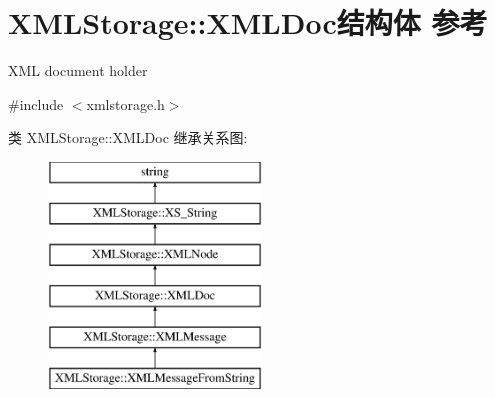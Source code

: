 \hypertarget{struct_x_m_l_storage_1_1_x_m_l_doc}{}\section{X\+M\+L\+Storage\+:\+:X\+M\+L\+Doc结构体 参考}
\label{struct_x_m_l_storage_1_1_x_m_l_doc}


X\+ML document holder  




{\ttfamily \#include $<$xmlstorage.\+h$>$}

类 X\+M\+L\+Storage\+:\+:X\+M\+L\+Doc 继承关系图\+:\begin{figure}[H]
\begin{center}
\leavevmode
\includegraphics[height=6.000000cm]{struct_x_m_l_storage_1_1_x_m_l_doc}
\end{center}
\end{figure}
